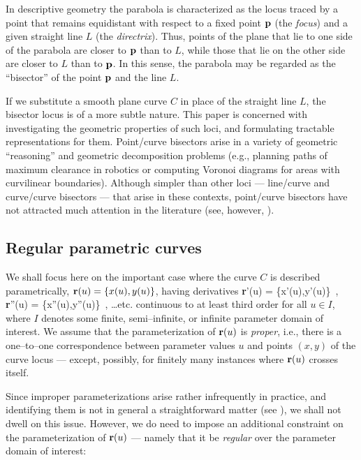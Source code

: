 In descriptive geometry \cite{coxeter69} the parabola is
characterized as the locus traced by a point that remains
equidistant with respect to a fixed point ${\bf p}$ (the
{\it focus\/}) and a given straight line $L$ (the {\it
directrix\/}). Thus, points of the plane that lie to one
side of the parabola are closer to ${\bf p}$ than to $L$,
while those that lie on the other side are closer to $L$
than to ${\bf p}$. In this sense, the parabola may be
regarded as the ``bisector'' of the point ${\bf p}$ and
the line $L$.

If we substitute a smooth plane curve $C$ in place of
the straight line $L$, the bisector locus is of a more
subtle nature. This paper is concerned with investigating
the geometric properties of such loci, and formulating
tractable representations for them. Point/curve bisectors
arise in a variety of geometric ``reasoning'' and geometric
decomposition problems (e.g., planning paths of maximum
clearance in robotics or computing Voronoi diagrams for areas
with curvilinear boundaries). Although simpler than other
loci --- line/curve and curve/curve bisectors --- that arise
in these contexts, point/curve bisectors have not attracted
much attention in the literature (see, however, \cite
{yap87,yap89}).

\subsection{Regular parametric curves}

We shall focus here on the important case where the curve $C$
is described parametrically, ${\bf r}(u)=\{x(u),y(u)\}$, having
derivatives
\be \label{derivs}
{\bf r}'(u) = \{x'(u),y'(u)\} \,, \quad
{\bf r}''(u) = \{x''(u),y''(u)\} \,, \quad
\ldots {\rm etc.}
\ee
continuous to at least third order for all $u \in I$, where $I$
denotes some finite, semi--infinite, or infinite parameter domain
of interest. We assume that the parameterization of ${\bf r}(u)$
is {\it proper}, i.e., there is a one--to--one correspondence
between parameter values $u$ and points $(x,y)$ of the curve
locus --- except, possibly, for finitely many instances where
${\bf r}(u)$ crosses itself.

Since improper parameterizations arise rather infrequently in
practice, and identifying them is not in general a straightforward
matter (see \cite{sederberg84,sederberg86}), we shall not dwell on
this issue. However, we do need to impose an additional constraint
on the parameterization of ${\bf r}(u)$ --- namely that it be {\it
regular\/} over the parameter domain of interest:

